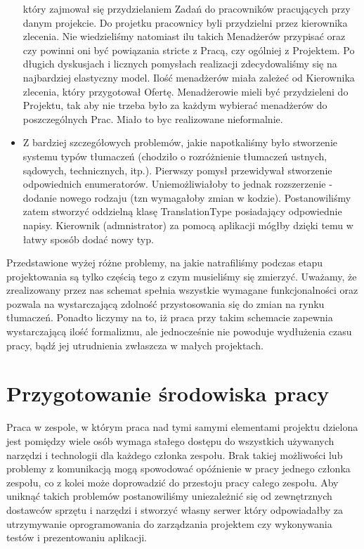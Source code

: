 \documentclass[licencjacka]{pracamgr}
\begin{document}
\begin{itemize}
który zajmował się przydzielaniem Zadań do pracowników pracujących przy danym projekcie. Do projetku pracownicy byli przydzielni przez kierownika zlecenia.
Nie wiedzieliśmy natomiast ilu takich Menadżerów przypisać oraz czy powinni oni być powiązania stricte z Pracą, czy ogólniej z Projektem. 
Po długich dyskusjach i licznych pomysłach realizacji zdecydowaliśmy się na najbardziej elastyczny model. Ilość menadżerów miała zależeć od Kierownika zlecenia, który przygotował Ofertę. 
Menadżerowie mieli być przydzieleni do Projektu, tak aby nie trzeba było za każdym wybierać menadżerów do poszczególnych Prac.
Miało to byc realizowane nieformalnie.
\item Z bardziej szczegółowych problemów, jakie napotkaliśmy było stworzenie systemu typów tłumaczeń (chodziło o rozróżnienie tłumaczeń ustnych, sądowych, technicznych, itp.).
Pierwszy pomysł przewidywał stworzenie odpowiednich enumeratorów. Uniemożliwiałoby to jednak rozszerzenie - dodanie nowego rodzaju (tzn wymagałoby zmian w kodzie). 
Postanowiliśmy zatem stworzyć oddzielną klasę TranslationType posiadający odpowiednie napisy. Kierownik (admnistrator) za pomocą aplikacji mógłby dzięki temu w łatwy sposób dodać nowy typ.
\end{itemize}
Przedstawione wyżej różne problemy, na jakie natrafiliśmy podczas etapu projektowania są tylko częścią tego z czym musieliśmy się zmierzyć. 
Uważamy, że zrealizowany przez nas schemat spełnia wszystkie wymagane funkcjonalności oraz pozwala na wystarczającą zdolność przystosowania się do zmian na rynku tłumaczeń.
Ponadto liczymy na to, iż praca przy takim schemacie zapewnia wystarczającą ilość formalizmu, ale jednocześnie nie powoduje wydłużenia czasu pracy, bądź jej utrudnienia zwłaszcza w małych projektach. 

\section{Przygotowanie środowiska pracy}
Praca w zespole, w którym praca nad tymi samymi elementami projektu dzielona jest pomiędzy wiele osób wymaga stałego dostępu do wszystkich używanych narzędzi i technologii dla każdego członka zespołu. Brak takiej możliwości lub problemy z komunikacją mogą spowodować opóźnienie w pracy jednego członka zespołu, co z kolei może doprowadzić do przestoju pracy całego zespołu. Aby uniknąć takich problemów postanowiliśmy uniezależnić się od zewnętrznych dostawców sprzętu i narzędzi i stworzyć własny serwer który odpowiadałby za utrzymywanie oprogramowania do zarządzania projektem czy wykonywania testów i prezentowaniu aplikacji. \\
\end{document}

